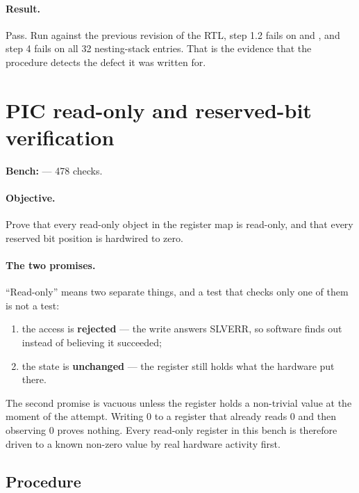 \paragraph{Result.} Pass. Run against the previous revision of the RTL, step
1.2 fails on  and , and step 4 fails on all 32
nesting-stack entries. That is the evidence that the procedure detects the
defect it was written for.

\section{PIC read-only and reserved-bit verification}
\label{sec:vp-picro}

\textbf{Bench:}  --- 478 checks.

\paragraph{Objective.} Prove that every read-only object in the register map is
read-only, and that every reserved bit position is hardwired to zero.

\paragraph{The two promises.} ``Read-only'' means two separate things, and a
test that checks only one of them is not a test:

\begin{enumerate}[leftmargin=*,itemsep=2pt]
\item the access is \textbf{rejected} --- the write answers SLVERR, so software
finds out instead of believing it succeeded;
\item the state is \textbf{unchanged} --- the register still holds what the
hardware put there.
\end{enumerate}

The second promise is vacuous unless the register holds a non-trivial value at
the moment of the attempt. Writing 0 to a register that already reads 0 and then
observing 0 proves nothing. Every read-only register in this bench is therefore
driven to a known non-zero value by real hardware activity first.

\subsection*{Procedure}

